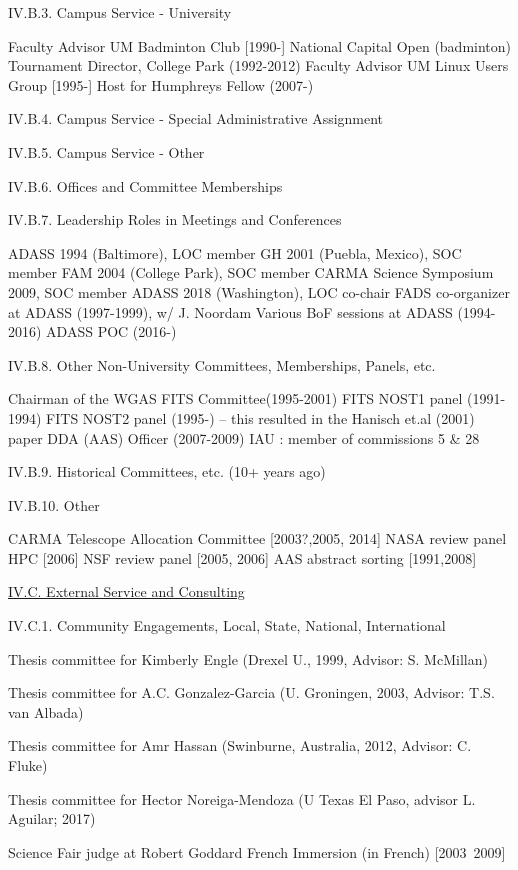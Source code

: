 \documentclass[11pt,letterpaper]{article}
\newcommand{\newi}{\newline\indent}
\begin{document}
IV.B.3. Campus Service - University
                
Faculty Advisor UM Badminton Club [1990-]\newi
National Capital Open  (badminton) Tournament Director, College Park (1992-2012)\newi
Faculty Advisor UM Linux Users Group [1995-]\newi
Host for Humphreys Fellow (2007-)\newi

IV.B.4. Campus Service - Special Administrative Assignment

IV.B.5. Campus Service - Other

IV.B.6. Offices and Committee Memberships 

IV.B.7. Leadership Roles in Meetings and Conferences

ADASS 1994 (Baltimore), LOC member\newi
GH 2001 (Puebla, Mexico), SOC member\newi
FAM 2004 (College Park), SOC member\newi
CARMA Science Symposium 2009, SOC member\newi
ADASS 2018 (Washington), LOC co-chair\newi
FADS co-organizer at ADASS (1997-1999), w/ J. Noordam\newi
Various BoF sessions at ADASS (1994-2016)\newi      
ADASS POC (2016-)\newi

IV.B.8. Other Non-University Committees, Memberships, Panels, etc.

Chairman of the WGAS FITS Committee(1995-2001)\newi
FITS NOST1 panel (1991-1994) \newi
FITS NOST2 panel (1995-) -- this resulted in the Hanisch et.al (2001) paper\newi
DDA (AAS) Officer (2007-2009)\newi
IAU : member of commissions 5 \& 28\newi

IV.B.9. Historical Committees, etc. (10+ years ago)

IV.B.10. Other

CARMA Telescope Allocation Committee [2003?,2005, 2014]\newi
NASA review panel HPC [2006]\newi
NSF review panel  [2005, 2006]\newi
AAS abstract sorting [1991,2008]\newi


\underline{IV.C. External Service and Consulting}

IV.C.1. Community Engagements, Local, State, National, International

Thesis committee for Kimberly Engle (Drexel U., 1999, Advisor: S. McMillan)

Thesis committee for  A.C. Gonzalez-Garcia (U. Groningen, 2003, Advisor: T.S. van Albada) 

Thesis committee for Amr Hassan (Swinburne, Australia, 2012, Advisor: C. Fluke)

Thesis committee for Hector Noreiga-Mendoza (U Texas El Paso, advisor L. Aguilar; 2017)

Science Fair judge at Robert Goddard French Immersion (in French) [2003~2009]
\end{document}
